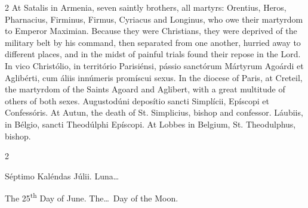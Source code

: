 \begin{paracol}{2}
\switchcolumn
{}
At Satalis in Armenia, seven saintly 
 brothers, all martyrs: Orentius, Heros, Pharnacius, Firminus, Firmus, 
 Cyriacus and Longinus, who owe their martyrdom to Emperor Maximian. 
 Because they were Christians, they were deprived of the military belt by his 
 command, then separated from one another, hurried away to different places, 
 and in the midst of painful trials found their repose in the Lord.
\switchcolumn*
{}
In vico Christólio, in 
 território Parisiénsi, pássio sanctórum Mártyrum Agoárdi et Aglibérti, cum 
 áliis innúmeris promíscui sexus.
\switchcolumn
{}
In the diocese of Paris, at Creteil, 
 the martyrdom of the Saints Agoard and Aglibert, with a great multitude of 
 others of both sexes.
\switchcolumn*
{}
Augustodúni deposítio 
 sancti Simplícii, Epíscopi et Confessóris.
\switchcolumn
{}
At Autun, the death of St. 
 Simplicius, bishop and confessor.
\switchcolumn*
{}
Láubiis, in Bélgio, 
 sancti Theodúlphi Epíscopi.
\switchcolumn
{}
At Lobbes in Belgium, St. 
 Theodulphus, bishop.
\switchcolumn*
{}
\end{paracol}


\begin{paracol}{2}
\begin{center}{\color{gregoriocolor} Séptimo Kaléndas Júlii. 
 Luna\dots\ }\end{center}
\switchcolumn
{}
\begin{center}{\color{gregoriocolor} The 
 25\textsuperscript{th} Day of 
 June. The\dots\ Day of the Moon.}\end{center}
\end{paracol}


